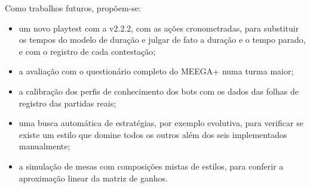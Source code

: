 Como trabalhos futuros, propõem-se:
\begin{itemize}
  \item um novo playtest com a v2.2.2, com as ações cronometradas, para substituir os tempos do modelo de duração
    e julgar de fato a duração e o tempo parado, e com o registro de cada contestação;
  \item a avaliação com o questionário completo do MEEGA+ \cite{petri2017meega} numa turma maior;
  \item a calibração dos perfis de conhecimento dos bots com os dados das folhas de registro das partidas reais;
  \item uma busca automática de estratégias, por exemplo evolutiva, para verificar se existe um estilo que
    domine todos os outros além dos seis implementados manualmente;
  \item a simulação de mesas com composições mistas de estilos, para conferir a aproximação linear da
    matriz de ganhos.
\end{itemize}
